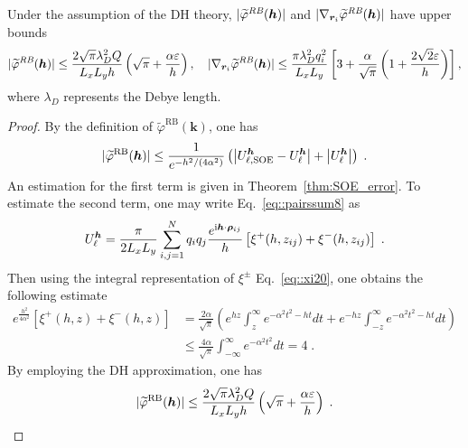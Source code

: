 \begin{lem} 
	Under the assumption of the DH theory, $|\widetilde{\varphi}^{\emph{RB}}(\bm{h})|$ and $|\nabla_{\bm{r}_i}\widetilde{\varphi}^{\emph{RB}}(\bm{h})|$ have upper bounds
	\begin{equation}
		\lvert \widetilde{\varphi}^{\emph{RB}}(\bm{h})\rvert\leq\frac{2\sqrt{\pi}\lambda_D^2 Q}{L_xL_y h}\left(\sqrt{\pi}+\frac{\alpha \varepsilon}{h}\right),
		\quad
		\lvert\nabla_{\bm{r}_{i}} \widetilde{\varphi}^{\emph{RB}}(\bm{h})\rvert\leq  \frac{\pi \lambda_D^2 q_{i}^2}{L_xL_y}\left[3+\frac{\alpha}{\sqrt{\pi}}\left(1+\frac{2\sqrt{2}\varepsilon}{h}\right)\right], 
	\end{equation}
	where $\lambda_{D}$ represents the Debye length.
	\label{lem::upper_bound_phiRB}
\end{lem}
\begin{proof}
	By the definition of $\widetilde{\varphi}^{\text{RB}}(\bm{k})$, one has
	\begin{equation}
		\lvert \widetilde{\varphi}^{\text{RB}}(\bm{h})\rvert\leq \frac{1}{e^{-h^2/(4\alpha^2)}}\left(\left|U_{\ell,\text{SOE}}^{\bm{h}}-U_{\ell}^{\bm{h}}\right|+\left|U_{\ell}^{\bm{h}}\right|\right)\;.
	\end{equation}
	An estimation for the first term is given in Theorem~\ref{thm:SOE_error}. 
	To estimate the second term, one may write Eq.~\eqref{eq::pairssum8} as
	\begin{equation}
		U_{\ell}^{\bm{h}} = \frac{\pi}{2 L_x L_y} \sum_{i, j = 1}^N q_i q_j \frac{e^{\mathrm{i} \boldsymbol{h} \cdot \boldsymbol{\rho}_{ij}}}{h} \left[ \xi^{+} (h, z_{ij})+\xi^{-} (h, z_{ij}) \right]\;.
	\end{equation}
	Then using the integral representation of $\xi^{\pm}$ Eq.~\eqref{eq::xi20}, one obtains the following estimate
	\begin{equation}\label{eq::118}
		\begin{split}
			e^{\frac{h^2}{4 \alpha^2}} \left[\xi^{+} (h, z)+\xi^{-} (h, z)\right] & = \frac{2\alpha}{\sqrt{\pi}} \left(e^{h z} \int_{z}^{\infty} e^{-\alpha^2 t^2 - ht} dt+e^{-h z} \int_{-z}^{\infty} e^{-\alpha^2 t^2 - ht} dt\right)\\
			& \leq \frac{4\alpha}{\sqrt{\pi}} \int_{- \infty}^{\infty} e^{-\alpha^2 t^2} dt= 4\;.
		\end{split}
	\end{equation}
	By employing the DH approximation, one has
	\begin{equation}
		\abs{ \widetilde{\varphi}^{\text{RB}}(\bm{h})}  \leq  \frac{2\sqrt{\pi}\lambda_D^2 Q}{L_xL_y h} \left(\sqrt{\pi} + \frac{\alpha \varepsilon}{h}\right)\;.

\end{equation}
\end{proof}
